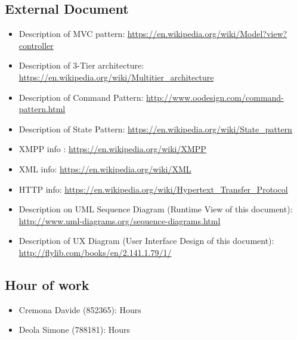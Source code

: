 \documentclass[../../dd.tex]{subfiles}
\begin{document}
		\subsection{External Document}
		\begin{itemize}
		\item Description of MVC pattern: \url{https://en.wikipedia.org/wiki/Model?view?controller}
		
		\item Description of 3-Tier architecture: \url{https://en.wikipedia.org/wiki/Multitier_architecture}
		
		\item Description of Command Pattern: \url{http://www.oodesign.com/command-pattern.html}
		
		\item Description of State Pattern: \url{https://en.wikipedia.org/wiki/State_pattern}
		
		\item XMPP info : \url{https://en.wikipedia.org/wiki/XMPP}		
		
		\item XML info: \url{https://en.wikipedia.org/wiki/XML}
		
		\item HTTP info: \url{https://en.wikipedia.org/wiki/Hypertext_Transfer_Protocol}
				
		\item Description on UML Sequence Diagram (Runtime View of this document): \url{http://www.uml-diagrams.org/sequence-diagrams.html}		
		\item Description of UX Diagram (User Interface Design of this document): \url{http://flylib.com/books/en/2.141.1.79/1/}
		
				\end{itemize}
		
		\subsection{Hour of work}
		
		\begin{itemize}
		\item Cremona Davide (852365): Hours
		\item Deola Simone (788181): Hours
		\end{itemize}
\end{document}
